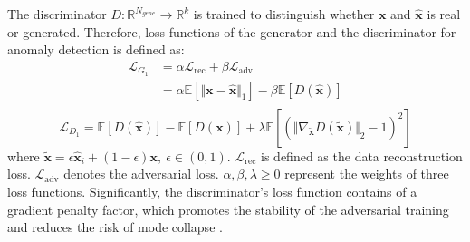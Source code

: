 \documentclass{article}
\begin{document}
The discriminator $D: \mathbb{R}^{N_{gene}} \rightarrow \mathbb{R}^k$ is trained to distinguish whether $\bm{x}$ and $\widehat{\bm{x}}$ is real or generated.
Therefore, loss functions of the generator and the discriminator for anomaly detection is defined as:
\begin{equation}
\begin{split}
    \mathcal{L}_{G_1} &= \alpha\mathcal{L}_{\text{rec}} + \beta\mathcal{L}_{\text{adv}} \\
    &= \alpha\mathbb{E}\left[\Vert \bm{x} - \widehat{\bm{x}}\Vert_1\right] - \beta\mathbb{E}\left[D(\widehat{\bm{x}})\right] \\
\end{split}
\end{equation}
\begin{equation}
    \mathcal{L}_{D_1} = \mathbb{E}\left[D(\widehat{\bm{x}})\right] - \mathbb{E}\left[D(\bm{x})\right] + \lambda\mathbb{E}\left[\left({\Vert \nabla_{\widetilde{\bm{x}}} D(\widetilde{\bm{x}}) \Vert}_2 - 1\right)^2\right]  
\end{equation}
where $\widetilde{\bm{x}}=\epsilon\widehat{\bm{x}}_i+(1-\epsilon){\bm{x}},\ \epsilon\in(0,1)$. 
$\mathcal{L}_{\text{rec}}$ is defined as the data reconstruction loss.
$\mathcal{L}_{\text{adv}}$ denotes the adversarial loss. $\alpha, \beta, \lambda\geq0$ represent the weights of three loss functions. 
Significantly, the discriminator's loss function contains of a gradient penalty factor,
which promotes the stability of the adversarial training and reduces the risk of mode collapse \cite{wGANs}.
\end{document}
